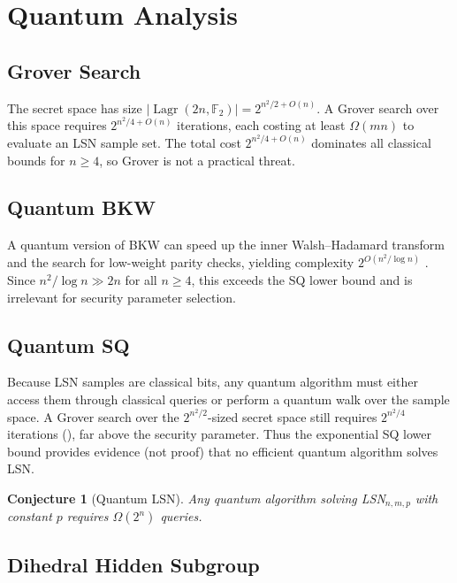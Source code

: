 \documentclass[11pt,a4paper]{article}
\theoremstyle{plain}
\newtheorem{conjecture}[theorem]{Conjecture}
\theoremstyle{definition}
\newcommand{\F}{\mathbb{F}}
\DeclareMathOperator{\Lagr}{Lagr}
\begin{document}
\section{Quantum Analysis}
\label{sec:quantum}

\subsection{Grover Search}
\label{subsec:grover}

The secret space has size $|\Lagr(2n,\F_2)| = 2^{n^2/2 + O(n)}$. A Grover search over this space requires $2^{n^2/4 + O(n)}$ iterations, each costing at least $\Omega(mn)$ to evaluate an LSN sample set. The total cost $2^{n^2/4 + O(n)}$ dominates all classical bounds for $n \geq 4$, so Grover is not a practical threat.

\subsection{Quantum BKW}
\label{subsec:qbkw}

A quantum version of BKW can speed up the inner Walsh--Hadamard transform and the search for low-weight parity checks, yielding complexity $2^{O(n^2 / \log n)}$ \cite{Kir11}. Since $n^2/\log n \gg 2n$ for all $n \geq 4$, this exceeds the SQ lower bound and is irrelevant for security parameter selection.

\subsection{Quantum SQ}
\label{subsec:quantum-sq}

Because LSN samples are classical bits, any quantum algorithm must either access them through classical queries or perform a quantum walk over the sample space. A Grover search over the $2^{n^2/2}$-sized secret space still requires $2^{n^2/4}$ iterations (), far above the security parameter. Thus the exponential SQ lower bound provides evidence (not proof) that no efficient quantum algorithm solves LSN.

\begin{conjecture}[Quantum LSN]
\label{conj:quantum}
Any quantum algorithm solving LSN$_{n,m,p}$ with constant $p$ requires $\Omega(2^n)$ queries.
\end{conjecture}

\subsection{Dihedral Hidden Subgroup}
\label{subsec:dhsp}
\end{document}
